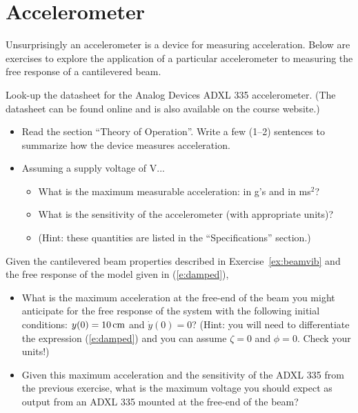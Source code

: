 \section{Accelerometer}
Unsurprisingly an accelerometer is a device for measuring acceleration.  Below are exercises to explore the application of a particular accelerometer to measuring the free response of a cantilevered beam.

\begin{ex}
Look-up the datasheet for the Analog Devices ADXL 335 accelerometer.  (The datasheet can be found online and is also available on the course website.)
\begin{itemize}
\item Read the section ``Theory of Operation''.  Write a few (1--2) sentences to summarize how the device measures acceleration.
\item Assuming a supply voltage of \unit[3]{V}...
  \begin{itemize}
  \item What is the maximum measurable acceleration: in g's and in \unit[]{m}{s$^2$}?
  \item What is the sensitivity of the accelerometer (with appropriate units)?
  \item (Hint: these quantities are listed in the ``Specifications'' section.)
  \end{itemize}
\end{itemize}
\end{ex}


\begin{ex}
Given the cantilevered beam properties described in Exercise~\ref{ex:beamvib} and the free response of the model given in (\ref{e:damped}),
\begin{itemize}
\item What is the maximum acceleration at the free-end of the beam  you might anticipate for the free response of the system with the following initial conditions: $y(0)=\unit[10]{cm}$ and $\dot{y}(0)=0$? (Hint: you will need to differentiate the expression (\ref{e:damped}) and you can assume $\zeta=0$ and $\phi=0$. Check your units!)
\item Given this maximum acceleration and the sensitivity of the ADXL 335 from the previous exercise, what is the maximum voltage you should expect as output from an ADXL 335 mounted at the free-end of the beam?
\end{itemize}
\end{ex}
